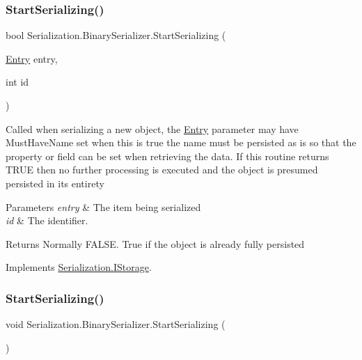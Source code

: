 \subsubsection{\texorpdfstring{Start\+Serializing()}{StartSerializing()}\hspace{0.1cm}{\footnotesize\ttfamily [1/2]}}
{\footnotesize\ttfamily bool Serialization.\+Binary\+Serializer.\+Start\+Serializing (\begin{DoxyParamCaption}\item[{\hyperlink{class_serialization_1_1_entry}{Entry}}]{entry,  }\item[{int}]{id }\end{DoxyParamCaption})\hspace{0.3cm}{\ttfamily [inline]}}



Called when serializing a new object, the \hyperlink{class_serialization_1_1_entry}{Entry} parameter may have Must\+Have\+Name set when this is true the name must be persisted as is so that the property or field can be set when retrieving the data. If this routine returns T\+R\+UE then no further processing is executed and the object is presumed persisted in its entirety 


\begin{DoxyParams}{Parameters}
{\em entry} & The item being serialized\\
\hline
{\em id} & The identifier.\\
\hline
\end{DoxyParams}
\begin{DoxyReturn}{Returns}
Normally F\+A\+L\+SE. True if the object is already fully persisted
\end{DoxyReturn}


Implements \hyperlink{interface_serialization_1_1_i_storage_a62f447c10caea0bd0c2ec3bad36fe14a}{Serialization.\+I\+Storage}.

\mbox{\label{class_serialization_1_1_binary_serializer_a7266eb0f6366fe0d40bbcb9d4434f262}} 
\subsubsection{\texorpdfstring{Start\+Serializing()}{StartSerializing()}\hspace{0.1cm}{\footnotesize\ttfamily [2/2]}}
{\footnotesize\ttfamily void Serialization.\+Binary\+Serializer.\+Start\+Serializing (\begin{DoxyParamCaption}{ }\end{DoxyParamCaption})\hspace{0.3cm}{\ttfamily [inline]}}



